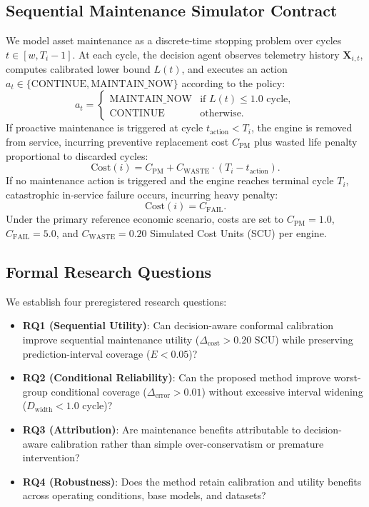 \documentclass[conference]{IEEEtran}
\newcommand{\Cost}{\text{Cost}}
\newcommand{\CPM}{C_{\text{PM}}}
\newcommand{\CFAIL}{C_{\text{FAIL}}}
\newcommand{\CWASTE}{C_{\text{WASTE}}}
\newcommand{\Deltacost}{\Delta_{\text{cost}}}
\newcommand{\Deltaerror}{\Delta_{\text{error}}}
\newcommand{\Dwidth}{D_{\text{width}}}
\begin{document}
\subsection{Sequential Maintenance Simulator Contract}
We model asset maintenance as a discrete-time stopping problem over cycles $t \in [w, T_i - 1]$. At each cycle, the decision agent observes telemetry history $\mathbf{X}_{i,t}$, computes calibrated lower bound $L(t)$, and executes an action $a_t \in \{\text{CONTINUE}, \text{MAINTAIN\_NOW}\}$ according to the policy:
\begin{equation}
a_t = \begin{cases} 
\text{MAINTAIN\_NOW} & \text{if } L(t) \le 1.0 \text{ cycle}, \\ 
\text{CONTINUE} & \text{otherwise}. 
\end{cases}
\end{equation}
If proactive maintenance is triggered at cycle $t_{\text{action}} < T_i$, the engine is removed from service, incurring preventive replacement cost $\CPM$ plus wasted life penalty proportional to discarded cycles:
\begin{equation}
\Cost(i) = \CPM + \CWASTE \cdot (T_i - t_{\text{action}}).
\end{equation}
If no maintenance action is triggered and the engine reaches terminal cycle $T_i$, catastrophic in-service failure occurs, incurring heavy penalty:
\begin{equation}
\Cost(i) = \CFAIL.
\end{equation}
Under the primary reference economic scenario, costs are set to $\CPM = 1.0$, $\CFAIL = 5.0$, and $\CWASTE = 0.20$ Simulated Cost Units (SCU) per engine.

\subsection{Formal Research Questions}
We establish four preregistered research questions:
\begin{itemize}
    \item \textbf{RQ1 (Sequential Utility)}: Can decision-aware conformal calibration improve sequential maintenance utility ($\Deltacost > 0.20$ SCU) while preserving prediction-interval coverage ($E < 0.05$)?
    \item \textbf{RQ2 (Conditional Reliability)}: Can the proposed method improve worst-group conditional coverage ($\Deltaerror > 0.01$) without excessive interval widening ($\Dwidth < 1.0$ cycle)?
    \item \textbf{RQ3 (Attribution)}: Are maintenance benefits attributable to decision-aware calibration rather than simple over-conservatism or premature intervention?
    \item \textbf{RQ4 (Robustness)}: Does the method retain calibration and utility benefits across operating conditions, base models, and datasets?
\end{itemize}
\end{document}
